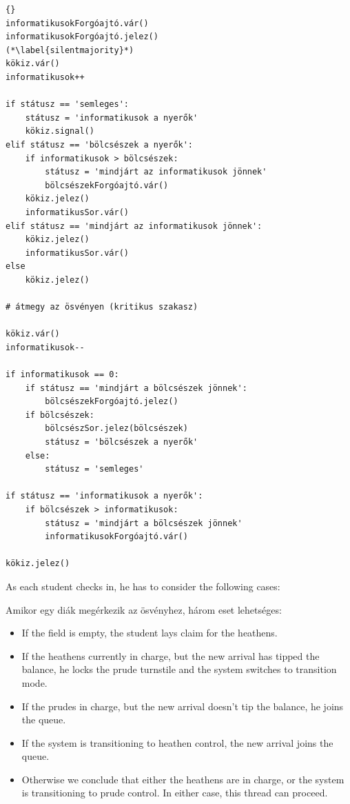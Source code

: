 \documentclass{book}
\begin{document}
\begin{lstlisting}[title={Az F épület problémája megoldás}]{}
informatikusokForgóajtó.vár()
informatikusokForgóajtó.jelez()
(*\label{silentmajority}*)
kökiz.vár()
informatikusok++

if státusz == 'semleges':
    státusz = 'informatikusok a nyerők'
    kökiz.signal()
elif státusz == 'bölcsészek a nyerők':
    if informatikusok > bölcsészek:
        státusz = 'mindjárt az informatikusok jönnek'
        bölcsészekForgóajtó.vár()
    kökiz.jelez()
    informatikusSor.vár()
elif státusz == 'mindjárt az informatikusok jönnek':
    kökiz.jelez()
    informatikusSor.vár()
else
    kökiz.jelez()

# átmegy az ösvényen (kritikus szakasz)

kökiz.vár()
informatikusok--

if informatikusok == 0:
    if státusz == 'mindjárt a bölcsészek jönnek':
        bölcsészekForgóajtó.jelez()
    if bölcsészek:
        bölcsészSor.jelez(bölcsészek)
        státusz = 'bölcsészek a nyerők'
    else:
        státusz = 'semleges'
        
if státusz == 'informatikusok a nyerők':
    if bölcsészek > informatikusok:
        státusz = 'mindjárt a bölcsészek jönnek'
        informatikusokForgóajtó.vár()

kökiz.jelez()
\end{lstlisting}

As each student checks in, he has to
consider the following cases:

Amikor egy diák megérkezik az ösvényhez, három eset lehetséges:

\begin{itemize}

\item If the field is empty, the student lays claim for the heathens.

\item If the heathens currently in charge, but the new arrival
has tipped the balance, he locks the prude turnstile and the
system switches to transition mode.

\item If the prudes in charge, but the new arrival doesn't
tip the balance, he joins the queue.

\item If the system is transitioning to heathen control, the new arrival
joins the queue.

\item Otherwise we conclude that either the heathens are in charge, or the
system is transitioning to prude control.  In either case, this
thread can proceed.

\end{itemize}  
\end{document}
